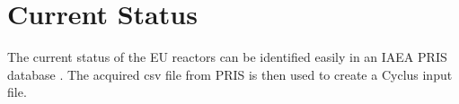 \section{Current Status}
The current status of the \gls{EU} reactors can be identified easily
in an \gls{IAEA} \gls{PRIS} database \cite{iaea_pris_nodate}.
The acquired csv file from \gls{PRIS} is then used to create a
Cyclus input file.
